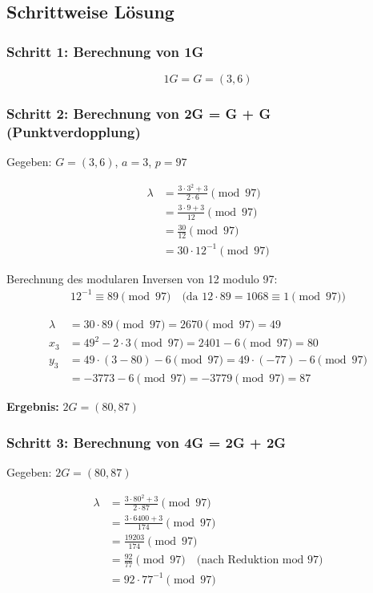 \documentclass{article}
\begin{document}
\subsection{Schrittweise Lösung}

\subsubsection{Schritt 1: Berechnung von 1G}
\begin{equation}
1G = G = (3, 6)
\end{equation}

\subsubsection{Schritt 2: Berechnung von 2G = G + G (Punktverdopplung)}
Gegeben: $G = (3, 6)$, $a = 3$, $p = 97$

\begin{align}
\lambda &= \frac{3 \cdot 3^2 + 3}{2 \cdot 6} \pmod{97} \\
&= \frac{3 \cdot 9 + 3}{12} \pmod{97} \\
&= \frac{30}{12} \pmod{97} \\
&= 30 \cdot 12^{-1} \pmod{97}
\end{align}

\noindent
Berechnung des modularen Inversen von 12 modulo 97:
\begin{align}
12^{-1} \equiv 89 \pmod{97} \quad \text{(da } 12 \cdot 89 = 1068 \equiv 1 \pmod{97}\text{)}
\end{align}

\begin{align}
\lambda &= 30 \cdot 89 \pmod{97} = 2670 \pmod{97} = 49 \\
x_3 &= 49^2 - 2 \cdot 3 \pmod{97} = 2401 - 6 \pmod{97} = 80 \\
y_3 &= 49 \cdot (3 - 80) - 6 \pmod{97} = 49 \cdot (-77) - 6 \pmod{97} \\
&= -3773 - 6 \pmod{97} = -3779 \pmod{97} = 87
\end{align}

\textbf{Ergebnis:} $2G = (80, 87)$

\subsubsection{Schritt 3: Berechnung von 4G = 2G + 2G}
Gegeben: $2G = (80, 87)$

\begin{align}
\lambda &= \frac{3 \cdot 80^2 + 3}{2 \cdot 87} \pmod{97} \\
&= \frac{3 \cdot 6400 + 3}{174} \pmod{97} \\
&= \frac{19203}{174} \pmod{97} \\
&= \frac{92}{77} \pmod{97} \quad \text{(nach Reduktion mod 97)} \\
&= 92 \cdot 77^{-1} \pmod{97}
\end{align}
\end{document}
